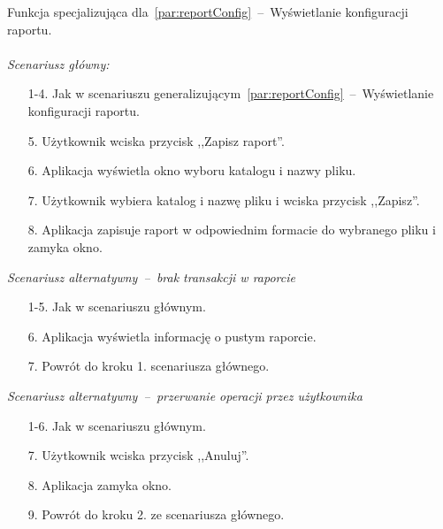\indent Funkcja specjalizująca dla~\ref{par:reportConfig}~--~Wyświetlanie konfiguracji raportu.\\\\
\textit{Scenariusz główny:}
\begin{enumerate}
  \item[1-4.] Jak w scenariuszu generalizującym~\ref{par:reportConfig}~--~Wyświetlanie konfiguracji raportu.
  \item[5.] Użytkownik wciska przycisk ,,Zapisz raport''.
  \item[6.] Aplikacja wyświetla okno wyboru katalogu i nazwy pliku.
  \item[7.] Użytkownik wybiera katalog i nazwę pliku i wciska przycisk ,,Zapisz''.
  \item[8.] Aplikacja zapisuje raport w odpowiednim formacie do wybranego pliku i zamyka okno.
\end{enumerate}

\textit{Scenariusz alternatywny~--~brak transakcji w raporcie}
\begin{enumerate}
  \item[1-5.] Jak w scenariuszu głównym.
  \item[6.] Aplikacja wyświetla informację o pustym raporcie.
  \item[7.] Powrót do kroku 1. scenariusza głównego.
\end{enumerate}

\textit{Scenariusz alternatywny~--~przerwanie operacji przez użytkownika}
\begin{enumerate}
  \item[1-6.] Jak w scenariuszu głównym.
  \item[7.] Użytkownik wciska przycisk ,,Anuluj''.
  \item[8.] Aplikacja zamyka okno.
  \item[9.] Powrót do kroku 2. ze scenariusza głównego.
\end{enumerate}

